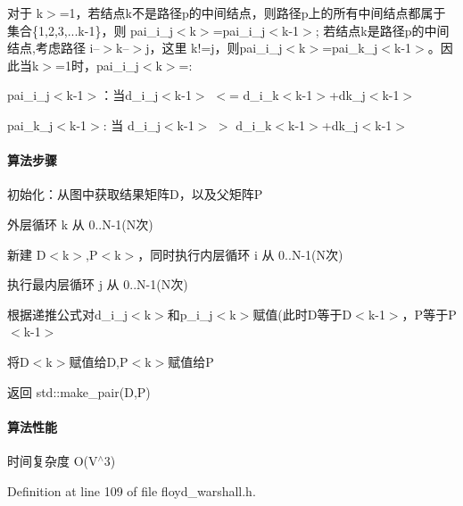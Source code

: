 对于 k$>$=1，若结点k不是路径p的中间结点，则路径p上的所有中间结点都属于集合\{1,2,3,...k-\/1\}，则 pai\+\_\+i\+\_\+j$<$k$>$=pai\+\_\+i\+\_\+j$<$k-\/1$>$; 若结点k是路径p的中间结点,考虑路径 i--$>$k--$>$j，这里 k!=j，则pai\+\_\+i\+\_\+j$<$k$>$=pai\+\_\+k\+\_\+j$<$k-\/1$>$。因此当k$>$=1时，pai\+\_\+i\+\_\+j$<$k$>$=\+:


\begin{DoxyItemize}
\item pai\+\_\+i\+\_\+j$<$k-\/1$>$：当d\+\_\+i\+\_\+j$<$k-\/1$>$ $<$= d\+\_\+i\+\_\+k$<$k-\/1$>$+dk\+\_\+j$<$k-\/1$>$
\item pai\+\_\+k\+\_\+j$<$k-\/1$>$\+: 当 d\+\_\+i\+\_\+j$<$k-\/1$>$ $>$ d\+\_\+i\+\_\+k$<$k-\/1$>$+dk\+\_\+j$<$k-\/1$>$
\end{DoxyItemize}

\paragraph*{算法步骤}


\begin{DoxyItemize}
\item 初始化：从图中获取结果矩阵\+D，以及父矩阵\+P
\item 外层循环 k 从 0..N-\/1(N次)
\begin{DoxyItemize}
\item 新建 D$<$k$>$,P$<$k$>$，同时执行内层循环 i 从 0..N-\/1(N次)
\item 执行最内层循环 j 从 0..N-\/1(N次)
\begin{DoxyItemize}
\item 根据递推公式对d\+\_\+i\+\_\+j$<$k$>$和p\+\_\+i\+\_\+j$<$k$>$赋值(此时\+D等于\+D$<$k-\/1$>$，\+P等于\+P$<$k-\/1$>$
\end{DoxyItemize}
\item 将\+D$<$k$>$赋值给\+D,P$<$k$>$赋值给\+P
\end{DoxyItemize}
\item 返回 std\+::make\+\_\+pair(\+D,\+P)
\end{DoxyItemize}

\paragraph*{算法性能}

时间复杂度 O(\+V$^\wedge$3) 

Definition at line 109 of file floyd\+\_\+warshall.\+h.

\hypertarget{namespace_introduction_to_algorithm_1_1_graph_algorithm_a1581960f77507024b39572aeb6d1fbd6}{}
